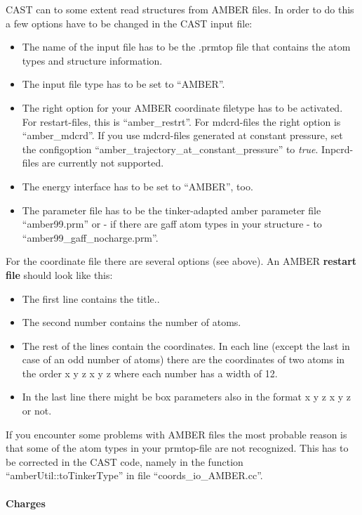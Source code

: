 \documentclass[10pt,a4paper]{article} %
\begin{document}
\ac{CAST} can to some extent read structures from \ac{AMBER} files. In order to do this a few options have to be changed in the CAST input file:
\begin{itemize}
\item The name of the input file has to be the .prmtop file that contains the atom types and structure information.
\item The input file type has to be set to ``AMBER''.
\item The right option for your AMBER coordinate filetype has to be activated. For restart-files, this is ``amber\_restrt''. For mdcrd-files the right option is ``amber\_mdcrd''. If you use mdcrd-files generated at constant pressure, set the configoption ``amber\_trajectory\_at\_constant\_pressure'' to \textit{true}. Inpcrd-files are currently not supported.
\item The energy interface has to be set to ``AMBER'', too.
\item The parameter file has to be the tinker-adapted amber parameter file ``amber99.prm'' or - if there are gaff atom types in your structure - to ``amber99\_gaff\_nocharge.prm''.
\end{itemize}

For the coordinate file there are several options (see above). An AMBER \textbf{restart file }should look like this:
\begin{itemize}
\item The first line contains the title..
\item The second number contains the number of atoms.
\item The rest of the lines contain the coordinates. In each line (except the last in case of an odd number of atoms) there are the coordinates of two atoms in the order x y z x y z where each number has a width of 12.
\item In the last line there might be box parameters also in the format x y z x y z or not.
\end{itemize}

If you encounter some problems with \ac{AMBER} files the most probable reason is that some of the atom types in your prmtop-file are not recognized. This has to be corrected in the \ac{CAST} code, namely in the function ``amberUtil::toTinkerType'' in file ``coords\_io\_AMBER.cc''.

\paragraph{Charges}
\end{document}
